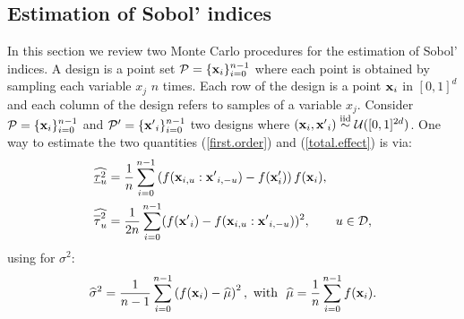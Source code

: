 \subsection{Estimation of Sobol' indices}
\label{sec:2.2}
In this section we review two Monte Carlo procedures for the estimation of Sobol' indices. A design is a point set $\mathcal{P}=\{\boldsymbol{\mathbf{x}}_i\}_{i=0}^{n-1}$ where each point is obtained by sampling each variable $x_j$ $n$ times. Each row of the design is a point $\boldsymbol{\mathbf{x}}_i$ in $[0,1]^d$ and each column of the design refers to samples of a variable $x_j$. Consider $\mathcal{P}=\{\boldsymbol{\mathbf{x}}_i\}_{i=0}^{n-1}$ and $\mathcal{P'}=\{{\boldsymbol{\mathbf{x}}'}_i\}_{i=0}^{n-1}$ two designs where $(\boldsymbol{\mathbf{x}}_i,{\boldsymbol{\mathbf{x}}'}_i) \stackrel{{\rm iid}}{\sim} \mathcal{U}([0,1]^{2d})$. One way to estimate the two quantities (\ref{first.order}) and (\ref{total.effect}) is via:
\begin{align}
\label{first.order.est}
\widehat{\underline{\tau}_u^2} &= \frac{1}{n} \sum \limits_{i=0}^{n-1} \left(f(\vx_{i,u}:{\vx'}_{i,-u})-f(\vx'_i)\right)f(\vx_i),\\
\label{total.effect.est}
\widehat{\ov{$\tau$}_u^2} &= \frac{1}{2n} \sum \limits_{i=0}^{n-1} (f({\vx'}_i) - f(\vx_{i,u}:{\vx'}_{i,-u}))^2, \qquad u \in \mathcal{D},
\end{align}
using for $\sigma^2$:
\begin{equation}\label{mu.est}
\widehat{\sigma}^2 = \frac{1}{n-1} \sum \limits_{i=0}^{n-1} \left(f(\boldsymbol{\mathbf{x}}_i) - \widehat{\mu}\right)^2, \text{ with } \ \widehat{\mu} =  \frac{1}{n} \sum \limits_{i=0}^{n-1}f(\boldsymbol{\mathbf{x}}_i).
\end{equation}

